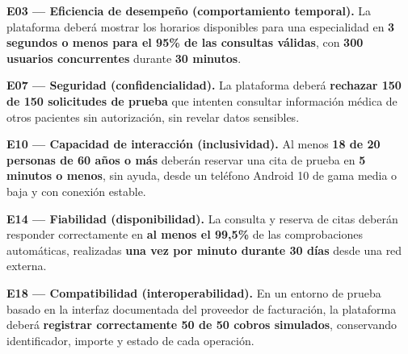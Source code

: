 \documentclass[10pt,a4paper,onecolumn]{IEEEtran}
\begin{document}
\noindent\textbf{E03 — Eficiencia de desempeño (comportamiento temporal).} La plataforma deberá mostrar los horarios disponibles para una especialidad en \textbf{3 segundos o menos para el 95\% de las consultas válidas}, con \textbf{300 usuarios concurrentes} durante \textbf{30 minutos}.

\par

\noindent\textbf{E07 — Seguridad (confidencialidad).} La plataforma deberá \textbf{rechazar 150 de 150 solicitudes de prueba} que intenten consultar información médica de otros pacientes sin autorización, sin revelar datos sensibles.

\par

\noindent\textbf{E10 — Capacidad de interacción (inclusividad).} Al menos \textbf{18 de 20 personas de 60 años o más} deberán reservar una cita de prueba en \textbf{5 minutos o menos}, sin ayuda, desde un teléfono Android 10 de gama media o baja y con conexión estable.

\par

\noindent\textbf{E14 — Fiabilidad (disponibilidad).} La consulta y reserva de citas deberán responder correctamente en \textbf{al menos el 99,5\%} de las comprobaciones automáticas, realizadas \textbf{una vez por minuto durante 30 días} desde una red externa.

\par

\noindent\textbf{E18 — Compatibilidad (interoperabilidad).} En un entorno de prueba basado en la interfaz documentada del proveedor de facturación, la plataforma deberá \textbf{registrar correctamente 50 de 50 cobros simulados}, conservando identificador, importe y estado de cada operación.
\end{document}
